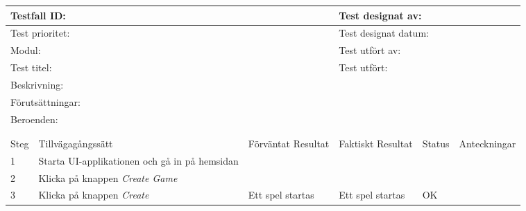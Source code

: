 
\begin{tabular}{@{}| p{1cm}|  p{3cm} | p{3cm}| p{3cm}| p{2cm}| p{3cm}|}
	\hline
	  \multicolumn{3}{|l|}{Testfall ID:}&\multicolumn{3}{|l|}{Test designat av:}\\
	  \hline
	  \multicolumn{3}{|l|}{Test prioritet:}&\multicolumn{3}{|l|}{Test designat datum:}\\
	  \hline
	  \multicolumn{3}{|l|}{Modul:}&\multicolumn{3}{|l|}{Test utfört av:}\\
	  \hline
	  \multicolumn{3}{|l|}{Test titel:}&\multicolumn{3}{|l|}{Test utfört:}\\
	  \hline
	  \multicolumn{6}{|p{\textwidth}|}{Beskrivning:}\\
	  \hline
	  \multicolumn{6}{|p{\textwidth}|}{Förutsättningar:}\\
	  \hline
	  \multicolumn{6}{|p{\textwidth}|}{Beroenden:}\\
  
	\hline
	\multicolumn{6}{|l|}{}\\
	\multicolumn{6}{|l|}{}\\
      	\hline
	Steg&Tillvägagångssätt&Förväntat Resultat&Faktiskt Resultat&Status&Anteckningar \\
	\hline
	1&Starta UI-applikationen och gå in på hemsidan&&&&\\
      	\hline
	2&Klicka på knappen \textit{Create Game}&&&&\\
      	\hline
	3&Klicka på knappen \textit{Create}&Ett spel startas&Ett spel startas& OK&\\
      	\hline
\end{tabular}

